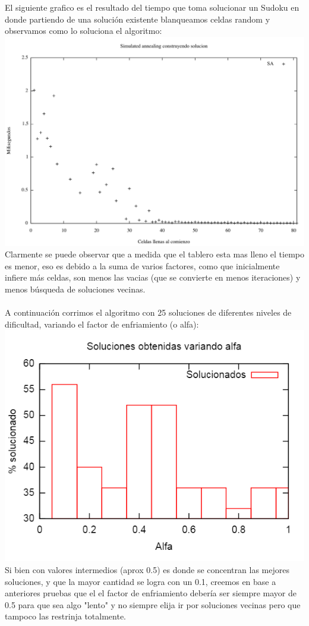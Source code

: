 El siguiente grafico es el resultado del tiempo que toma solucionar un Sudoku en donde partiendo de una solución existente blanqueamos celdas random y observamos como lo soluciona el algoritmo:\\
\includegraphics[scale=0.5]{imgs/randomSA.png}	\\
Clarmente se puede observar que a medida que el tablero esta mas lleno el tiempo es menor, eso es debido a la suma de varios factores, como que inicialmente infiere más celdas, son menos las vacias (que se convierte en menos iteraciones) y menos búsqueda de soluciones vecinas.\\\\

A continuación corrimos el algoritmo con 25 soluciones de diferentes niveles de dificultad, variando el factor de enfriamiento (o alfa):\\
\includegraphics[scale=0.7]{imgs/porc_soluc.png}	\\
Si bien con valores intermedios (aprox 0.5) es donde se concentran las mejores soluciones, y que la mayor cantidad se logra con un 0.1, creemos en base a anteriores pruebas que el el factor de enfriamiento debería ser siempre mayor de 0.5 para que sea algo "lento" y no siempre elija ir por soluciones vecinas pero que tampoco las restrinja totalmente. 
